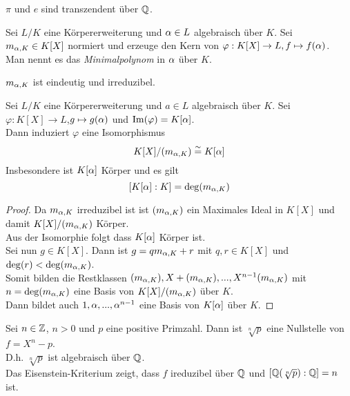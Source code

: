 	\begin{exm}
		$\pi$ und $e$ sind transzendent über $\mathbb{Q}$.
	\end{exm}

	\begin{definition}
		Sei $L/K$ eine Körpererweiterung und $\alpha\in L$ algebraisch über $K$. Sei $m_{\alpha,K}\in K[X]$ normiert und erzeuge den Kern von $\varphi:K[X]\to L,f\mapsto f(\alpha)$.\\
		Man nennt es das \emph{Minimalpolynom} in $\alpha$ über $K$.
	\end{definition}

	\begin{kor}
		$m_{\alpha,K}$ ist eindeutig und irreduzibel.
	\end{kor}

	\begin{satz}
		Sei $L/K$ eine Körpererweiterung und $a\in L$ algebraisch über $K$. Sei $\varphi:K[X]\to L$,$g\mapsto g(\alpha)$ und $\operatorname{Im}(\varphi)=K[\alpha]$.\\
		Dann induziert $\varphi$ eine Isomorphismus
		\[K[X]/(m_{\alpha,K})\overset{\sim}{=} K[\alpha]\]
		Insbesondere ist $K[\alpha]$ Körper und es gilt
		\[[K[\alpha]:K]=\deg(m_{\alpha,K})\]
	\end{satz}

	\begin{proof}
		Da $m_{\alpha,K}$ irreduzibel ist ist $(m_{\alpha,K})$ ein Maximales Ideal in $K[X]$ und damit $K[X]/(m_{\alpha,K})$ Körper.\\
		Aus der Isomorphie folgt dass $K[\alpha]$ Körper ist.\\ %
		Sei nun $g\in K[X]$. Dann ist $g=qm_{\alpha,K}+r$ mit $q,r\in K[X]$ und $\deg(r)<\deg(m_{\alpha,K})$.\\
		Somit bilden die Restklassen $(m_{\alpha,K}),X+(m_{\alpha,K}),...,X^{n-1}(m_{\alpha,K})$ mit $n=\deg(m_{\alpha,K})$ eine Basis von $K[X]/(m_{\alpha,K})$ über $K$.\\
		Dann bildet auch $1,\alpha,...,\alpha^{n-1}$ eine Basis von $K[\alpha]$ über $K$.
	\end{proof}

	\begin{exm}
		Sei $n\in\mathbb{Z}$, $n>0$ und $p$ eine positive Primzahl. Dann ist $\sqrt[n]{p}$ eine Nullstelle von $f=X^n-p$.\\
		D.h. $\sqrt[n]{p}$ ist algebraisch über $\mathbb{Q}$.\\
		Das Eisenstein-Kriterium zeigt, dass $f$ ireduzibel über $\mathbb{Q}$ und $[\mathbb{Q}(\sqrt[n]{p}):\mathbb{Q}]=n$ ist.
	\end{exm}

